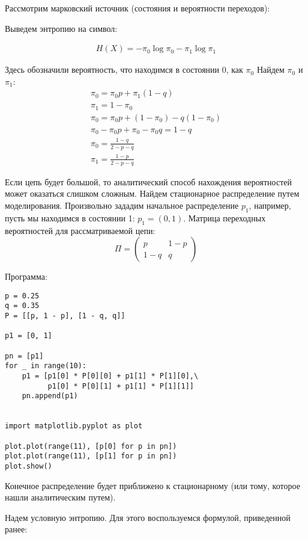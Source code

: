 Рассмотрим марковский источник (состояния и вероятности переходов):


Выведем энтропию на символ:

\begin{align*}
    H(X) = -\pi_0 \log \pi_0 - \pi_1 \log \pi_1
\end{align*}

Здесь обозначили вероятность, что находимся в состоянии 0, как $\pi_0$
Найдем $\pi_0$ и $\pi_1$:
\begin{gather*}
    \pi_0 = \pi_0 p + \pi_1 (1 - q)
    \\
    \pi_1 = 1 - \pi_0
    \\
    \pi_0 = \pi_0 p + (1 - \pi_0) - q(1 - \pi_0)
    \\
    \pi_0 - \pi_0 p + \pi_0 - \pi_0 q = 1 - q
    \\
    \pi_0 = \frac{1 - q}{2 - p - q}
    \\
    \pi_1 = \frac{1 - p}{2 - p - q}
\end{gather*}

Если цепь будет большой, то аналитический способ нахождения вероятностей может
оказаться слишком сложным. Найдем стационарное распределение путем моделирования.
Произвольно зададим начальное распределение $p_1$, например, пусть мы находимся в состоянии 1: $p_1 = (0, 1)$. Матрица переходных вероятностей для рассматриваемой цепи: 
\[
    \Pi =
    \begin{pmatrix}
        p & 1 - p
        \\
        1 - q & q
    \end{pmatrix}
\]

Программа:

\begin{verbatim}
p = 0.25
q = 0.35
P = [[p, 1 - p], [1 - q, q]]

p1 = [0, 1]

pn = [p1]
for _ in range(10):
    p1 = [p1[0] * P[0][0] + p1[1] * P[1][0],\
          p1[0] * P[0][1] + p1[1] * P[1][1]]
    pn.append(p1)


import matplotlib.pyplot as plot

plot.plot(range(11), [p[0] for p in pn])
plot.plot(range(11), [p[1] for p in pn])
plot.show()
\end{verbatim}

Конечное распределение будет приближено к стационарному (или тому, которое
нашли аналитическим путем).

Надем условную энтропию. Для этого воспользуемся формулой, приведенной ранее:

